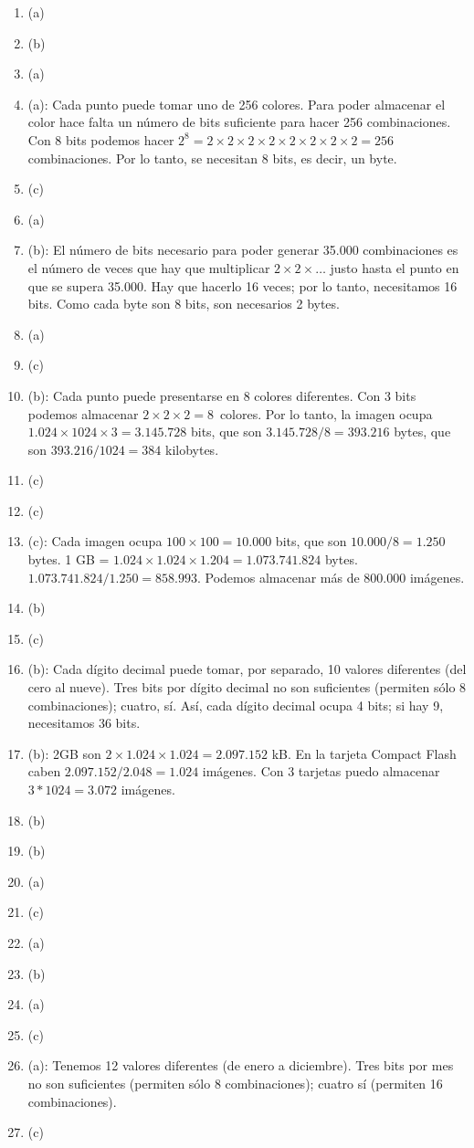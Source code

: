 \begin{enumerate}
\item (a) \item (b) \item (a) \item (a): Cada punto puede tomar uno de 256 colores. Para poder almacenar el color hace falta un número de bits suficiente para hacer 256 combinaciones. Con 8 bits podemos hacer \(2^8=2\times2\times 2\times 2\times 2\times 2\times 2\times 2=256\) combinaciones. Por lo tanto, se necesitan 8 bits, es decir, un byte. \item (c) 

\item (a) \item (b): El número de bits necesario para poder generar 35.000 combinaciones es el número de veces que hay que multiplicar \(2\times 2\times\ldots\) justo hasta el punto en que se supera 35.000. Hay que hacerlo 16 veces; por lo tanto, necesitamos 16 bits. Como cada byte son 8 bits, son necesarios 2 bytes. \item (a) \item (c) \item (b): Cada punto puede presentarse en 8 colores diferentes. Con 3 bits podemos almacenar \(2\times2\times2=8\)~colores. Por lo tanto, la imagen ocupa $1.024 \times 1024 \times 3 = 3.145.728$ bits, que son $3.145.728/8=393.216$ bytes, que son $393.216/1024=384$ kilobytes. 

\item (c) \item (c) \item (c): Cada imagen ocupa $100\times100 = 10.000$ bits, que son $10.000 / 8 = 1.250$ bytes. 1 GB = $1.024 \times 1.024 \times 1.204 = 1.073.741.824 $ bytes.\\ $ 1.073.741.824 / 1.250 = 858.993$. Podemos almacenar más de 800.000 imágenes. \item (b) \item (c) 

\item (b): Cada dígito decimal puede tomar, por separado, 10 valores diferentes (del cero al nueve). Tres bits por dígito decimal no son suficientes (permiten sólo 8 combinaciones); cuatro, sí. Así, cada dígito decimal ocupa 4 bits; si hay 9, necesitamos 36 bits. \item (b): 2GB son $ 2\times 1.024 \times 1.024 = 2.097.152$ kB. En la tarjeta Compact Flash caben $ 2.097.152 / 2.048 = 1.024$ imágenes. Con 3 tarjetas puedo almacenar $ 3 * 1024 = 3.072$ imágenes. \item (b) \item (b) \item (a) 

\item (c) \item (a) \item (b) \item (a) \item (c) 

\item (a): Tenemos 12 valores diferentes (de enero a diciembre). Tres bits por mes no son suficientes (permiten sólo 8 combinaciones); cuatro sí (permiten 16 combinaciones). \item (c) \end{enumerate} 
